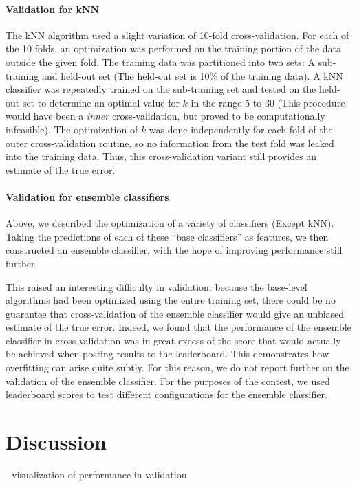 \documentclass[conference,letterpaper]{IEEEtran}
\begin{document}
\paragraph*{Validation for kNN}
The kNN algorithm used a slight variation of 10-fold cross-validation. For each of 
the 10 folds, an optimization was performed on the training portion of the data 
outside the given fold. The training data was partitioned into two sets: A
sub-training and held-out set (The held-out set is 10\% of the training data). A
kNN classifier was repeatedly trained on the sub-training set and tested on the
held-out set to determine an optimal value for $k$ in the range 5 to 30 (This 
procedure would have been a \textit{inner} cross-validation, but proved to be
computationally infeasible). The optimization of $k$ was done independently for 
each fold of the outer cross-validation routine, so no information from the test 
fold was leaked into the training data.  Thus, this cross-validation variant still
provides an estimate of the true error.

\paragraph*{Validation for ensemble classifiers}
Above, we described the optimization of a variety of classifiers (Except kNN).
Taking the predictions of each of these ``base classifiers'' as features, we then 
constructed an ensemble classifier, with the hope of improving performance
still further.

This raised an interesting difficulty in validation: because the base-level
algorithms had been optimized using the entire training set, there could be
no guarantee that cross-validation of the ensemble classifier would give 
an unbiased estimate of the true error.
Indeed, we found that the performance of the ensemble classifier in 
cross-validation was in great excess of the score that would actually be
achieved when posting results to the leaderboard.  This demonstrates how
overfitting can arise quite subtly.  For this reason, we do not report further
on the validation of the ensemble classifier.  For the purposes of the 
contest, we used leaderboard scores to test different configurations for the
ensemble classifier.


\section{Discussion}

- visualization of performance in validation
\end{document}

